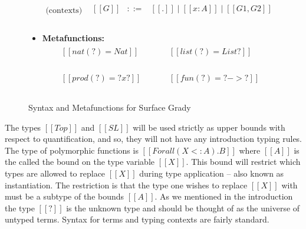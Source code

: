 \begin{figure}
\begin{mdframed}
\begin{itemize}
\[\begin{array}{cl}
        \text{(contexts)}  &
        \begin{array}{lcl}
          [[G]] & ::= & [[.]] \mid [[x : A]] \mid [[G1,G2]]\\
        \end{array}\\
      \end{array}
      \]
    \item[] \textbf{Metafunctions:}
      \[
      \begin{array}{lll}
        \begin{array}{lll}
          [[nat(?) = Nat]]\\
          [[nat(Nat) = Nat]]\\
        \end{array}
        & \quad & 
        \begin{array}{lll}
          [[list(?) = List ?]]\\
          [[list(List A) = List A]]\\
        \end{array}\\\\                       
        \begin{array}{lll}
          [[prod(?) = ? x ?]]\\
          [[prod(A x B) = A x B]]\\
        \end{array}
        & \quad &
        \begin{array}{lll}
          [[fun(?) = ? -> ?]]\\
          [[fun(A -> B) = A -> B]]\\
        \end{array}
      \end{array}
      \]
    \end{itemize}
  \end{mdframed}
  \caption{Syntax and Metafunctions for Surface Grady}
  \label{fig:syntax-surface-grady}
\end{figure}
The types $[[Top]]$ and $[[SL]]$ will be used strictly as upper bounds
with respect to quantification, and so, they will not have any
introduction typing rules. The type of polymorphic functions is
$[[Forall (X <: A).B]]$ where $[[A]]$ is the called the bound on the
type variable $[[X]]$.  This bound will restrict which types are
allowed to replace $[[X]]$ during type application -- also known as
instantiation.  The restriction is that the type one wishes to replace
$[[X]]$ with must be a subtype of the bounds $[[A]]$.  As we mentioned
in the introduction the type $[[?]]$ is the unknown type and should be
thought of as the universe of untyped terms.
Syntax for terms and typing contexts are fairly standard.  

